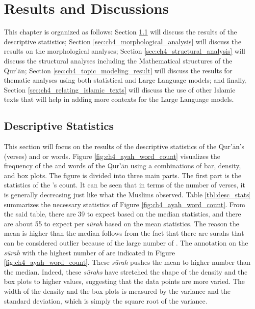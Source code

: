 \chapter{Results and Discussions}\label{ch:results}
This chapter is organized as follows: Section \ref{sec:ch4_desc_stat} will discuss the results of the descriptive statistics; Section \ref{sec:ch4_morphological_analysis} will discuss the results on the morphological analyses; Section \ref{sec:ch4_structural_analysis} will discuss the structural analyses including the Mathematical structures of the Qur'\=an; Section \ref{sec:ch4_topic_modeling_result} will discuss the results for thematic analyses using both statistical and Large Language models; and finally, 
Section \ref{sec:ch4_relating_islamic_texts} will discuss the use of other Islamic texts that will help in adding more contexts for the Large Language models.
\section{Descriptive Statistics}\label{sec:ch4_desc_stat}
This section will focus on the results of the descriptive statistics of the Qur'\=an's   (verses) and   or words. Figure \ref{fig:ch4_ayah_word_count} visualizes the frequency of the   and words of the Qur'\=an using a combinations of bar, density, and box plots. The figure is divided into three main parts. The first part is the statistics of the 's  count. It can be seen that in terms of the number of verses, it is generally decreasing just like what the Muslims observed. Table \ref{tbl:desc_stats} summarizes the necessary statistics of Figure \ref{fig:ch4_ayah_word_count}. From the said table, there are 39   to expect based on the median statistics, and there are about 55   to expect per \textit{s\=urah}  based on the mean statistics. The reason the mean is higher than the median follows from the fact that there are surahs that can be considered outlier because of the large number of  . The annotation on the \textit{s\=urah}  with the highest number of   are indicated in Figure \ref{fig:ch4_ayah_word_count}. These \textit{s\=urah}  pushes the mean to higher number than the median. Indeed, these \textit{s\=urahs}  have stretched the shape of the density and the box plots to higher values, suggesting that the data points are more varied. The width of the density and the box plots is measured by the variance and the standard deviation, which is simply the square root of the variance. 

